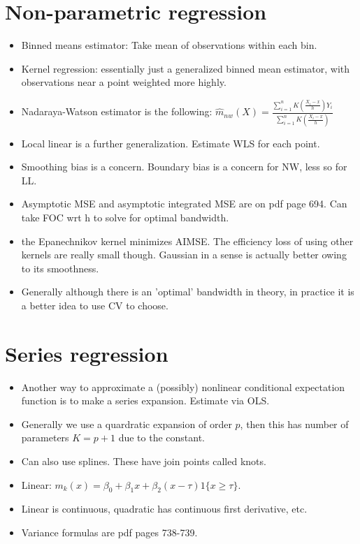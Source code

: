 \documentclass[11pt]{article} %
\begin{document}
\section{Non-parametric regression}
\begin{itemize}
\item Binned means estimator: Take mean of observations within each bin.
\item Kernel regression: essentially just a generalized binned mean estimator, with observations near a point weighted more highly.
\item Nadaraya-Watson estimator is the following: $\hat{m}_{nw}(X) = \frac{\sum_{i=1}^n K\left( \frac{X_i - x}{h}\right) Y_i}{\sum_{i=1}^nK\left( \frac{X_i - x}{h}\right) }$
\item Local linear is a further generalization. Estimate WLS for each point.
\item Smoothing bias is a concern. Boundary bias is a concern for NW, less so for LL.
\item Asymptotic MSE and asymptotic integrated MSE are on pdf page 694. Can take FOC wrt h to solve for optimal bandwidth.
\item the Epanechnikov kernel minimizes AIMSE. The efficiency loss of using other kernels are really small though. Gaussian in a sense is actually better owing to its smoothness.
\item Generally although there is an 'optimal' bandwidth in theory, in practice it is a better idea to use CV to choose.
\end{itemize}

\section{Series regression}
\begin{itemize}
\item Another way to approximate a (possibly) nonlinear conditional expectation function is to make a series expansion. Estimate via OLS.
\item Generally we use a quardratic expansion of order $p$, then this has number of parameters $K=p+1$ due to the constant.
\item Can also use splines. These have join points called knots.
\item Linear: $m_k(x) = \beta_0 + \beta_1x + \beta_2(x-\tau)1\{x\geq \tau\}$.
\item Linear is continuous, quadratic has continuous first derivative, etc.
\item Variance formulas are pdf pages 738-739.
\end{itemize}
\end{document}
